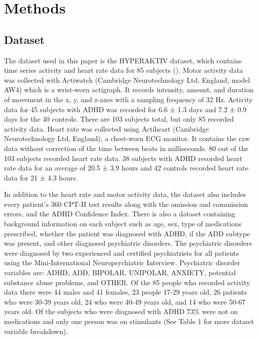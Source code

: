 \documentclass[,article,,moreauthors,pdftex]{mdpi}
\begin{document}
\hypertarget{methods}{%
\section{Methods}\label{methods}}

\hypertarget{dataset}{%
\subsection{Dataset}\label{dataset}}

The dataset used in this paper is the HYPERAKTIV dataset, which contains
time series activity and heart rate data for 85 subjects
(\citet{10.1145/3458305.3478454}). Motor activity data was collected
with Actiwatch (Cambridge Neurotechnology Ltd, England, model AW4) which
is a wrist-worn actigraph. It records intensity, amount, and duration of
movement in the x, y, and z-axes with a sampling frequency of 32 Hz.
Activity data for 45 subjects with ADHD was recorded for 6.6 ± 1.3 days
and 7.2 ± 0.9 days for the 40 controls. There are 103 subjects total,
but only 85 recorded activity data. Heart rate was collected using
Actiheart (Cambridge Neurotechnology Ltd, England), a chest-worn ECG
monitor. It contains the raw data without correction of the time between
beats in milliseconds. 80 out of the 103 subjects recorded heart rate
data. 38 subjects with ADHD recorded heart rate data for an average of
20.5 ± 3.9 hours and 42 controls recorded heart rate data for 21 ± 4.3
hours.

In addition to the heart rate and motor activity data, the dataset also
includes every patient's 360 CPT-II test results along with the omission
and commission errors, and the ADHD Confidence Index. There is also a
dataset containing background information on each subject such as age,
sex, type of medications prescribed, whether the patient was diagnosed
with ADHD, if the ADD subtype was present, and other diagnosed
psychiatric disorders. The psychiatric disorders were diagnosed by two
experienced and certified psychiatrists for all patients using the
Mini-International Neuropsychiatric Interview. Psychiatric disorder
variables are: ADHD, ADD, BIPOLAR, UNIPOLAR, ANXIETY, potential
substance abuse problems, and OTHER. Of the 85 people who recorded
activity data there were 44 males and 41 females, 23 people 17-29 years
old, 26 patients who were 30-39 years old, 24 who were 40-49 years old,
and 14 who were 50-67 years old. Of the subjects who were diagnosed with
ADHD 73\% were not on medications and only one person was on stimulants
(See Table 1 for more dataset variable breakdown).
\end{document}
